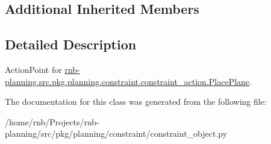 \subsection*{Additional Inherited Members}


\subsection{Detailed Description}
Action\+Point for \hyperlink{classrnb-planning_1_1src_1_1pkg_1_1planning_1_1constraint_1_1constraint__action_1_1_place_plane}{rnb-\/planning.\+src.\+pkg.\+planning.\+constraint.\+constraint\+\_\+action.\+Place\+Plane}. 

The documentation for this class was generated from the following file\+:\begin{DoxyCompactItemize}
\item 
/home/rnb/\+Projects/rnb-\/planning/src/pkg/planning/constraint/constraint\+\_\+object.\+py\end{DoxyCompactItemize}
